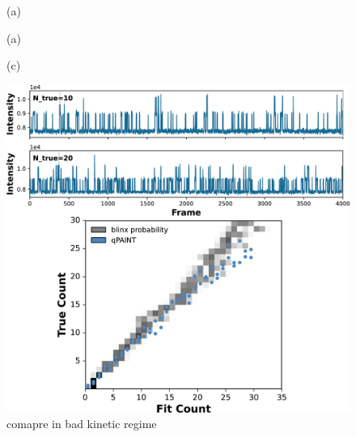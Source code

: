 \begin{figure}

  \begin{panel}{(a)}{\textwidth}
    \hspace{-2mm}%
    \setlength\plotwidth{\textwidth}%
    \setlength\plotheight{36mm}%
    
    \vspace{-4mm}
  \end{panel}

  \begin{panel}{(a)}{\textwidth}
    \hspace{-2mm}%
    \setlength\plotwidth{\textwidth}%
    \setlength\plotheight{36mm}%
    
    \vspace{-4mm}
  \end{panel}

  \begin{panel}{(c)}{\textwidth}
    \setlength\plotwidth{72mm}%
    \setlength\plotheight{72mm}%
    
  \end{panel}

\end{figure}

\begin{figure}
  \includegraphics[width=\linewidth]{figures/placeholders/figure_4_qpaint_kinetics.png}
  \caption{comapre in bad kinetic regime}
  \label{fig:results:qpaint_counting}
\end{figure}
